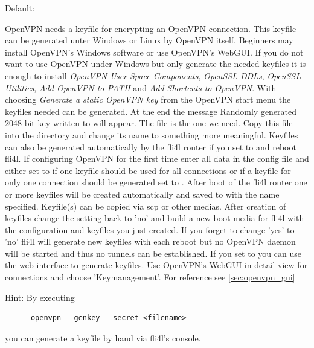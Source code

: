 \begin{description}

  Default: 

  OpenVPN needs a keyfile for encrypting an OpenVPN connection. This 
  keyfile can be generated unter Windows or Linux by OpenVPN itself. 
  Beginners may install OpenVPN's Windows software or use OpenVPN's
  WebGUI. If you do not want to use OpenVPN under Windows but only 
  generate the needed keyfiles it is enough to install 
  \emph{OpenVPN User-Space Components}, \emph{OpenSSL DDLs}, 
  \emph{OpenSSL Utilities}, \emph{Add OpenVPN to PATH} and 
  \emph{Add Shortcuts to OpenVPN}. With choosing 
  \emph{Generate a static OpenVPN key} from the OpenVPN start menu 
  the keyfiles needed can be generated. At the end the message 
  \glqq{}Randomly generated 2048 bit key written to
  \grqq{} will appear. 
  The file  is the one we need. Copy this file into 
  the directory  and change its name 
   to something more meaningful. Keyfiles can also be 
  generated automatically by the fli4l router if you set 
   to  and reboot fli4l. 
  If configuring OpenVPN for the first time enter all data in the 
  config file and either set 
  to  if one keyfile should be used for all connections or 
  if a keyfile for only one connection should be generated set  
   to . After boot of the 
  fli4l router one or more keyfiles will be created automatically 
  and saved to  with the name specified.  
  Keyfile(s) can be copied via scp or other medias. After creation 
  of keyfiles change the setting back to 'no' and build a new boot 
  media for fli4l with the configuration and keyfiles you just created. 
  If you forget to change 'yes' to 'no' fli4l will generate new keyfiles 
  with each reboot but no OpenVPN daemon will be started and thus no tunnels 
  can be established. If you set  to
   you can use the web interface to generate keyfiles. Use 
  OpenVPN's WebGUI in detail view for connections and choose 'Keymanagement'.
  For reference see \ref{sec:openvpn_gui}

  Hint: By executing 
  \begin{verbatim}
      openvpn --genkey --secret <filename>
  \end{verbatim}
  you can generate a keyfile by hand via fli4l's console.


\end{description}

